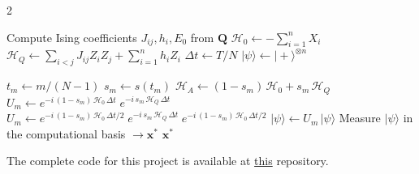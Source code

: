 \documentclass[10pt]{article}
\begin{document}
\begin{multicols*}{2}
{\begin{algorithmic}[1]
\State Compute Ising coefficients $J_{ij}, h_i, E_0$ from $\mathbf{Q}$ 
\State $\mathcal{H}_0 \leftarrow -\sum_{i=1}^{n} X_i$ 
\State $\mathcal{H}_Q \leftarrow \sum_{i<j} J_{ij} Z_i Z_j + \sum_{i=1}^{n} h_i Z_i$ 
\State $\Delta t \leftarrow T / N$
\State $|\psi\rangle \leftarrow |+\rangle^{\otimes n}$ 

    \State $t_m \leftarrow m / (N - 1)$
    \State $s_m \leftarrow s(t_m)$ 
    \State $\mathcal{H}_A \leftarrow (1 - s_m)\,\mathcal{H}_0 + s_m\,\mathcal{H}_Q$ 
     
        \State $U_m \leftarrow e^{-i\,(1-s_m)\,\mathcal{H}_0\,\Delta t}\; e^{-i\,s_m\,\mathcal{H}_Q\,\Delta t}$
     
        \State $U_m \leftarrow e^{-i\,(1-s_m)\,\mathcal{H}_0\,\Delta t/2}\; e^{-i\,s_m\,\mathcal{H}_Q\,\Delta t}\; e^{-i\,(1-s_m)\,\mathcal{H}_0\,\Delta t/2}$
    \EndIf
    \State $|\psi\rangle \leftarrow U_m\,|\psi\rangle$
\EndFor
\State Measure $|\psi\rangle$ in the computational basis $\rightarrow \mathbf{x}^*$
\State \Return $\mathbf{x}^*$
\end{algorithmic}
\small}
The complete code for this project is available at \href{https://github.com/hkbelagali/adiabatic-quantum-computation}{this} repository.

\end{multicols*}
\end{document}
